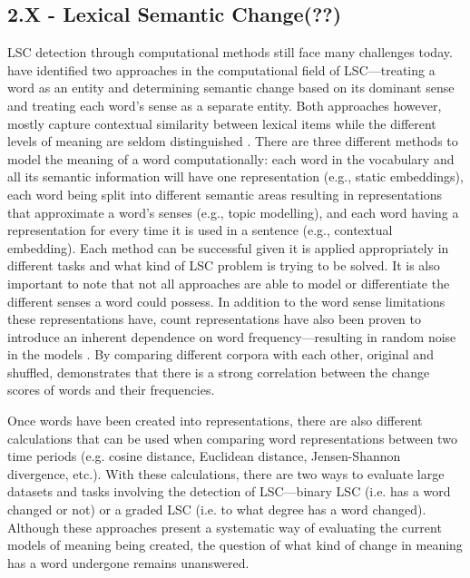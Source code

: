 \subsection{2.X - Lexical Semantic Change(??)}

LSC detection through computational methods still face many challenges today. \citet{hengchen2021challenges} have identified two approaches in the computational field of LSC—treating a word as an entity and determining semantic change based on its dominant sense and treating each word’s sense as a separate entity. Both approaches however, mostly capture contextual similarity between lexical items while the different levels of meaning are seldom distinguished \citep{hengchen2021challenges}. There are three different methods to model the meaning of a word computationally: each word in the vocabulary and all its semantic information will have one representation (e.g., static embeddings), each word being split into different semantic areas resulting in representations that approximate a word’s senses (e.g., topic modelling), and each word having a representation for every time it is used in a sentence (e.g., contextual embedding). Each method can be successful given it is applied appropriately in different tasks and what kind of LSC problem is trying to be solved. It is also important to note that not all approaches are able to model or differentiate the different senses a word could possess. In addition to the word sense limitations these representations have, count representations have also been proven to introduce an inherent dependence on word frequency—resulting in random noise in the models \citep{dubossarsky-etal-2017-outta}. By comparing different corpora with each other, original and shuffled, \citet{dubossarsky-etal-2017-outta} demonstrates that there is a strong correlation between the change scores of words and their frequencies. 

Once words have been created into representations, there are also different calculations that can be used when comparing word representations between two time periods (e.g. cosine distance, Euclidean distance, Jensen-Shannon divergence, etc.). With these calculations, there are two ways to evaluate large datasets and tasks involving the detection of LSC—binary LSC (i.e. has a word changed or not) or a graded LSC (i.e. to what degree has a word changed). Although these approaches present a systematic way of evaluating the current models of meaning being created, the question of what kind of change in meaning has a word undergone remains unanswered.

